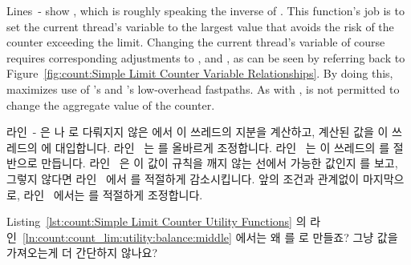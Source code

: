 \begin{lineref}
\begin{lineref}
Lines~- show ,
which is roughly speaking
the inverse of .
This function's job is to set the current thread's
 variable to the largest value that avoids the risk
of the counter exceeding the  limit.
Changing the current thread's  variable of course
requires corresponding adjustments to , 
and , as can be seen by referring back to
Figure~\ref{fig:count:Simple Limit Counter Variable Relationships}.
By doing this,  maximizes use of
's and 's low-overhead fastpaths.
As with ,  is not permitted
to change the aggregate value of the counter.
\fi

라인~- 은  나 
로 다뤄지지 않은  에서 이 쓰레드의 지분을 계산하고, 계산된
값을 이 쓰레드의  에 대입합니다.
라인~ 는  를 올바르게 조정합니다.
라인~ 는 이 쓰레드의  를  절반으로
만듭니다.
라인~ 은 이  값이 규칙을 깨지 않는 선에서 가능한
값인지  를 보고, 그렇지 않다면 라인~ 에서
 를 적절하게 감소시킵니다.
앞의 조건과 관계없이 마지막으로, 라인~ 에서는 
를 적절하게 조정합니다.

\end{lineref}

\QuickQuiz{}
	Listing~\ref{lst:count:Simple Limit Counter Utility Functions} 의
	라인~\ref{ln:count:count_lim:utility:balance:middle}
	에서는 왜  를  로 만들죠?
	그냥  값을 가져오는게 더 간단하지 않나요?
	\iffalse


\end{lineref}
